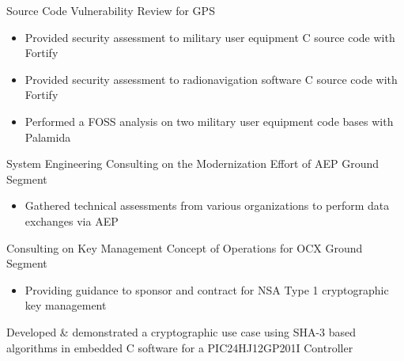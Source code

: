 \documentclass[letterpaper]{clinton-resume}
\begin{document}
\begin{minipage}[t]{0.66\textwidth}
\begin{tightitemize}
\begin{itemize}
	\end{itemize}
\item Source Code Vulnerability Review for GPS
	\begin{itemize}
		\item Provided security assessment to military user equipment C source code with Fortify
		\item Provided security assessment to radionavigation software  C source code with Fortify
		\item Performed a FOSS analysis on two military user equipment code bases with Palamida
	\end{itemize}
\item System Engineering Consulting on the Modernization Effort of AEP Ground Segment
	\begin{itemize}
		\item Gathered technical assessments from various organizations to perform data exchanges via AEP
	\end{itemize}
\item Consulting on Key Management Concept of Operations for OCX Ground Segment
	\begin{itemize}
		\item Providing guidance to sponsor and contract for NSA Type 1 cryptographic key management
	\end{itemize}
\end{tightitemize}

\vspace{\topsep} %
\begin{tightitemize}
\item Developed \& demonstrated a cryptographic use case using SHA-3 based algorithms in embedded C software for a PIC24HJ12GP201I Controller
\end{tightitemize}
\sectionspace %
\end{minipage}
\newpage%
\end{document}
